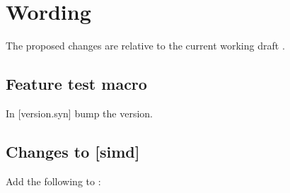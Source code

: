 \section{Wording}\label{sec:wording}
The proposed changes are relative to the current working draft \cite{N5008}.

\subsection{Feature test macro}

In [version.syn] bump the  version.

\subsection{Changes to {[simd]}}
\def\rSec#1[#2]#3{%
  \ifcase#1\wgSubsection[subsection]{#3}{#2}
  \or\wgSubsection[subsection]{#3}{#2}
  \or\wgSubsubsection[subsubsection]{#3}{#2}
  \or\wgSubsubsubsection[paragraph]{#3}{#2}
  \or\error
\fi}

Add the following to :

